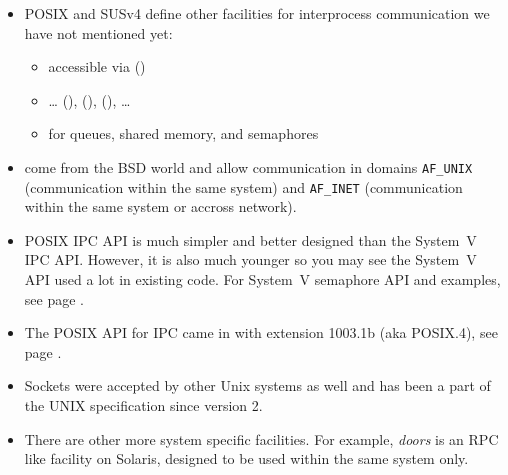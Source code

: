 

\begin{slide}
\begin{itemize}
\item POSIX and SUSv4 define other facilities for interprocess communication we
have not mentioned yet:
    \begin{itemize}
    \item {} accessible via ()
    \item {} \dots{} (),
    (), (), \dots{} 
    \item {} for queues, shared memory, and semaphores
    \end{itemize}
\item {} come from the BSD world and allow communication in domains
\texttt{AF\_UNIX} (communication within the same system) and \texttt{AF\_INET}
(communication within the same system or accross network).
\end{itemize}
\end{slide}

\begin{itemize}
\item POSIX IPC API is much simpler and better designed than the System~V IPC
API.  However, it is also much younger so you may see the System~V API used a
lot in existing code.  For System~V semaphore API and examples, see page
\pageref{SYSVSEM}.
\item The POSIX API for IPC came in with extension 1003.1b (aka POSIX.4), see
page \pageref{POSIX4}.
\item Sockets were accepted by other Unix systems as well and has been a part of
the UNIX specification since version 2.
\item There are other more system specific facilities.  For example,
\emph{doors} is an RPC like facility on Solaris, designed to be used within the
same system only.
\end{itemize}

\label{SYNCHRONIZATIONEND}

\endinput
